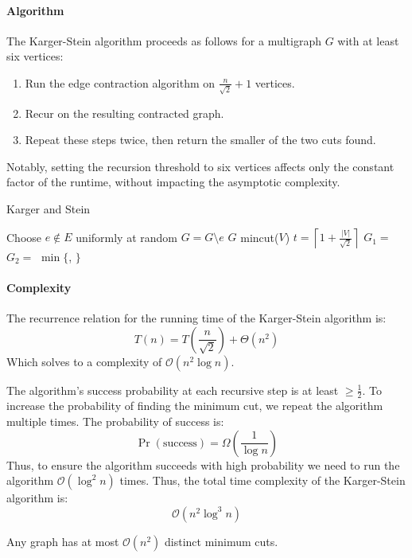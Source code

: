 \paragraph*{Algorithm}
The Karger-Stein algorithm proceeds as follows for a multigraph $G$ with at least six vertices:
\begin{enumerate}
    \item Run the edge contraction algorithm on $\frac{n}{\sqrt{2}}+1$ vertices.
    \item Recur on the resulting contracted graph.
    \item Repeat these steps twice, then return the smaller of the two cuts found.
\end{enumerate}
Notably, setting the recursion threshold to six vertices affects only the constant factor of the runtime, without impacting the asymptotic complexity.
\begin{algorithm}[H]
    \caption{Karger and Stein}
    \begin{algorithmic}[1]
                \State Choose $e\notin E$ uniformly at random
                \State $G=G\setminus e$
            \EndWhile 
            \State \Return $G$
        \EndFunction
        \Statex
                \State \Return mincut($V$)
            \Else 
                \State $t= \left\lceil  1 + \frac{\left\lvert V\right\rvert}{\sqrt{2}}\right\rceil$
                \State $G_1 =$ 
                \State $G_2 =$ 
                \State \Return $\min \{$, $\}$
            \EndIf
        \EndFunction
    \end{algorithmic}
\end{algorithm}  

\paragraph*{Complexity}
The recurrence relation for the running time of the Karger-Stein algorithm is:
\[T(n) = T\left(\frac{n}{\sqrt{2}}\right) + \Theta(n^2)\]
Which solves to a complexity of $\mathcal{O}(n^2 \log n)$.

The algorithm's success probability at each recursive step is at least $\geq \frac{1}{2}$. 
To increase the probability of finding the minimum cut, we repeat the algorithm multiple times.
The probability of success is: 
\[\Pr(\text{success}) = \Omega\left(\dfrac{1}{\log n}\right)\]
Thus, to ensure the algorithm succeeds with high probability we need to run the algorithm $\mathcal{O}(\log^2 n)$ times. 
Thus, the total time complexity of the Karger-Stein algorithm is: 
\[\mathcal{O}(n^2 \log^3 n)\]
\begin{corollary}
    Any graph has at most $\mathcal{O}(n^2)$ distinct minimum cuts.
\end{corollary}